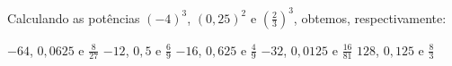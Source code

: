 Calculando as potências $(-4)^3$, $(0{,}25)^2$ e $\left(\frac{2}{3}\right)^3$, obtemos, respectivamente:

$-64$, $0{,}0625$ e $\frac{8}{27}$
$-12$, $0{,}5$ e $\frac{6}{9}$
$-16$, $0{,}625$ e $\frac{4}{9}$
$-32$, $0{,}0125$ e $\frac{16}{81}$
$128$, $0{,}125$ e $\frac{8}{3}$


